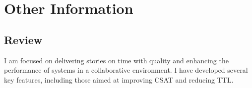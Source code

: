 \documentclass[letterpaper]{twentysecondcv} %
\begin{document}

\section{Other Information}

\subsection{Review}

I am focused on delivering stories on time with quality and enhancing the performance of systems in a collaborative environment. I have developed several key features, including those aimed at improving CSAT and reducing TTL.

\end{document}
